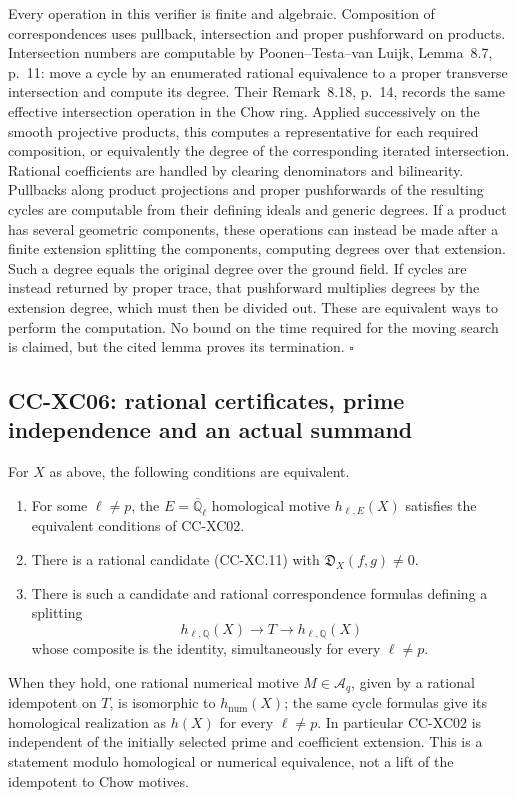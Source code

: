 Every operation in this verifier is finite and algebraic.
Composition of correspondences uses pullback, intersection
and proper pushforward on products.  Intersection numbers
are computable by Poonen--Testa--van Luijk, Lemma~8.7,
p.~11: move a cycle by an enumerated rational equivalence
to a proper transverse intersection and compute its degree.
Their Remark~8.18, p.~14, records the same effective
intersection operation in the Chow ring.  Applied successively
on the smooth projective products, this computes a
representative for each required composition, or equivalently
the degree of the corresponding iterated intersection.
Rational coefficients are handled by clearing denominators
and bilinearity.  Pullbacks along product projections and
proper pushforwards of the resulting cycles are computable
from their defining ideals and generic degrees.
If a product has several geometric components, these
operations can instead be made after a finite extension
splitting the components, computing degrees over that extension.  Such a degree equals
the original degree over the ground field.  If cycles are
instead returned by proper trace, that pushforward multiplies
degrees by the extension degree, which must then be divided
out.  These are equivalent ways to perform the computation.
No bound on the time required for the moving search is
claimed, but the cited lemma proves its termination.
\(\square\)

\subsection{CC-XC06: rational certificates, prime independence and an
actual summand}

For \(X\) as above, the following conditions are equivalent.
\begin{enumerate}
\item For some \(\ell\ne p\), the \(E=\overline{\mathbb Q}_\ell\)
homological motive \(h_{\ell,E}(X)\) satisfies the equivalent
conditions of CC-XC02.
\item There is a rational candidate (CC-XC.11) with
\(\mathfrak D_X(f,g)\ne0\).
\item There is such a candidate and rational correspondence
formulas defining a splitting
\[
 h_{\ell,\mathbb Q}(X)\longrightarrow T
                  \longrightarrow h_{\ell,\mathbb Q}(X)
 \]
whose composite is the identity, simultaneously for every
\(\ell\ne p\).
\end{enumerate}
When they hold, one rational numerical motive
\(M\in\mathcal A_q\), given by a rational idempotent on \(T\),
is isomorphic to \(h_{\mathrm{num}}(X)\); the same cycle
formulas give its homological realization as \(h(X)\) for
every \(\ell\ne p\).  In particular CC-XC02 is independent
of the initially selected prime and coefficient extension.
This is a statement modulo homological or numerical
equivalence, not a lift of the idempotent to Chow motives.

